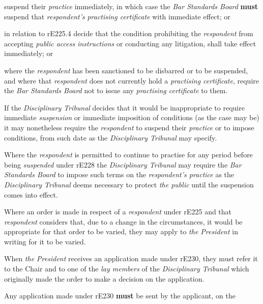 suspend their \emph{practice} immediately, in which case the \emph{Bar
Standards Board}  \textcolor{myred}{\textbf{must}} suspend that \emph{respondent's} \emph{practising
certificate} with immediate effect; or\item in relation to rE225.4 decide that the condition prohibiting
the \emph{respondent} from accepting \emph{public access
instructions} or conducting any litigation, shall take effect
immediately; or\item where the \emph{respondent} has been sanctioned to be disbarred or to
be suspended, and where that \emph{respondent} does not currently hold
a \emph{practising certificate}, require the \emph{Bar Standards
Board} not to issue any \emph{practising certificate} to them.\ln
{}\par
If the \emph{Disciplinary Tribunal }decides that it would be
inappropriate to require immediate \emph{suspension }or immediate
imposition of conditions (as the case may be) it may nonetheless require
the \emph{respondent }to suspend their \emph{practice }or to impose
conditions, from such date as the \emph{Disciplinary Tribunal }may
specify.\\
\par
Where the \emph{respondent }is permitted to continue to practise for any
period before being \emph{suspended }under
rE228\textbf{ }the \emph{Disciplinary Tribunal }may require
the \emph{Bar Standards Board }to impose such terms on
the \emph{respondent's practice }as the \emph{Disciplinary
Tribunal }deems necessary to protect \emph{the public }until the
suspension comes into effect.\\
\par
Where an order is made in respect of a \emph{respondent }under
rE225\textbf{ }and that \emph{respondent }considers that, due to a
change in the circumstances, it would be appropriate for that order to
be varied, they may apply to \emph{the President }in writing for it to
be varied.\\
\par
When \emph{the President }receives an application made under rE230, they
must refer it to the Chair and to one of the \emph{lay members }of
the \emph{Disciplinary Tribunal }which originally made the order to make
a decision on the application.\\
\par
Any application made under rE230  \textcolor{myred}{\textbf{must}} be sent by the applicant, on the
